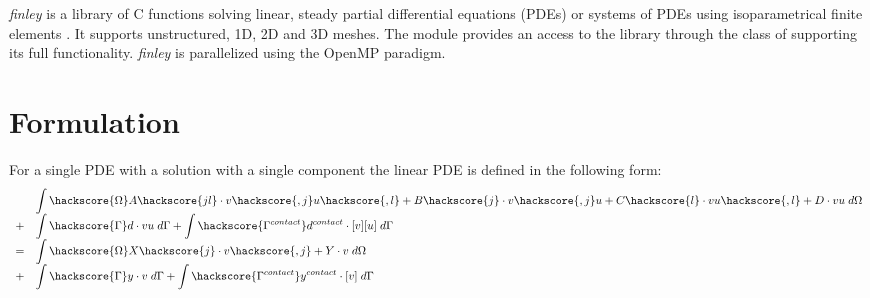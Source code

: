  

{\it finley} is a library of C functions solving linear, steady partial differential equations
 (PDEs) or systems of PDEs using isoparametrical finite
elements .
It supports unstructured, 1D, 2D and 3D meshes. The module \finley provides an access to the
library through the \LinearPDE class of \escript supporting its full functionality. {\it finley}
is parallelized using the OpenMP  paradigm.

\section{Formulation}

For a single PDE with a solution with a single component the linear PDE is defined in the
following form:
\begin{equation}\label{FINLEY.SINGLE.1}
\begin{array}{cl} &
\displaystyle{
\int\hackscore{\Omega}
A\hackscore{jl} \cdot v\hackscore{,j}u\hackscore{,l}+ B\hackscore{j} \cdot v\hackscore{,j} u+ C\hackscore{l} \cdot v u\hackscore{,l}+D \cdot vu \; d\Omega }  \\
+ & \displaystyle{\int\hackscore{\Gamma} d \cdot vu \; d{\Gamma} }
+  \displaystyle{\int\hackscore{\Gamma^{contact}} d^{contact} \cdot [v][u] \; d{\Gamma} } \\
= & \displaystyle{\int\hackscore{\Omega}  X\hackscore{j} \cdot v\hackscore{,j}+ Y \cdot v \; d\Omega }\\
+ & \displaystyle{\int\hackscore{\Gamma} y \cdot v \; d{\Gamma}}  +
\displaystyle{\int\hackscore{\Gamma^{contact}} y^{contact}\cdot [v] \; d{\Gamma}} \\
\end{array}
\end{equation}

